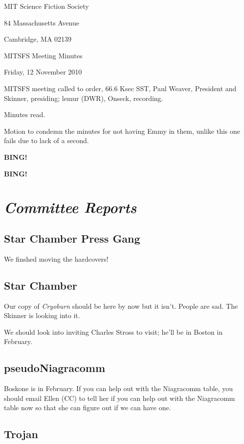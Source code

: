 \documentclass[10pt]{article}
\newcommand{\bing}{{\bf BING!} }
\newcommand{\goto}[1]{\bing \vskip 12pt \section*{{\em{#1}}}}
\newcommand{\skinner}{Paul Weaver, President and Skinner}
\newcommand{\onseck}{lemur (DWR), Onseck}
\newcommand{\meetingdate}{Friday, 12 November 2010}
\begin{document}
\begin{center}

MIT Science Fiction Society

84 Massachusetts Avenue

Cambridge, MA 02139

\vspace{12pt}

MITSFS Meeting Minutes

\meetingdate

\end{center}

\vspace{18pt}

\setlength{\parskip}{6pt}

\noindent
MITSFS meeting called to order, 66.6 Ksec SST,
\skinner, presiding; \onseck, recording.

Minutes read.

Motion to condemn the minutes for not having Emmy in them, unlike this one
fails due to lack of a second.

\bing

\goto{Committee Reports}

\subsection*{Star Chamber Press Gang}

We finshed moving the hardcovers!

\subsection*{Star Chamber}

Our copy of \emph{Cryoburn} should be here by now but it isn't.  People
are sad.  The Skinner is looking into it.

We should look into inviting Charles Stross to visit; he'll be in Boston
in February.

\subsection*{pseudoNiagracomm}

Boskone is in February.  If you can help out with the Niagracomm table, you
should email Ellen (CC) to tell her if you can help out with the Niagracomm
table now so that she can figure out if we can have one.

\subsection*{Trojan}
\end{document}
